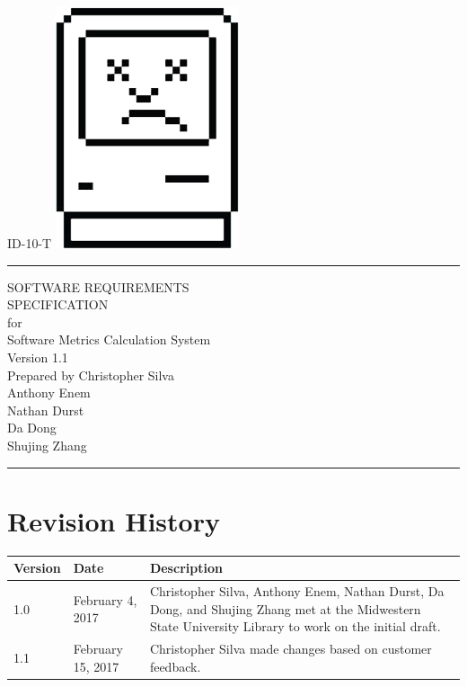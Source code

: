 \documentclass{scrreprt}
\author{Christopher Silva}
\date{}
\def\myversion{1.1 }
\begin{document}
	\begin{titlepage}
		\flushright
		\LARGE{ID-10-T}
		\includegraphics[scale=0.08]{logo.png}
		\rule{16cm}{5pt}\vskip1cm
		\Huge{SOFTWARE REQUIREMENTS\\ SPECIFICATION}\\
		\vspace{2cm}
		for\\
		\vspace{2cm}
		Software Metrics Calculation System\\
		\vspace{2cm}
		\LARGE{Version \myversion\\}
		\vspace{2cm}
		Prepared by Christopher Silva\\
		Anthony Enem\\
		Nathan Durst\\
		Da Dong\\
		Shujing Zhang\\
		\vfill
		\rule{16cm}{5pt}
	\end{titlepage}
	\tableofcontents
	\chapter*{Revision History}
	\begin{tabular}{|p{1.5cm}|p{3cm}|p{9.5cm}|}
		\hline 
		Version & Date & Description \\ 
		\hline 
		1.0 & February 4, 2017 & Christopher Silva, Anthony Enem, Nathan Durst, Da Dong, and Shujing Zhang met at the Midwestern State University Library to work on the initial draft. \\ 
		\hline
		1.1 & February 15, 2017 & Christopher Silva made changes based on customer feedback. \\
		\hline 
	\end{tabular} 
\end{document}
